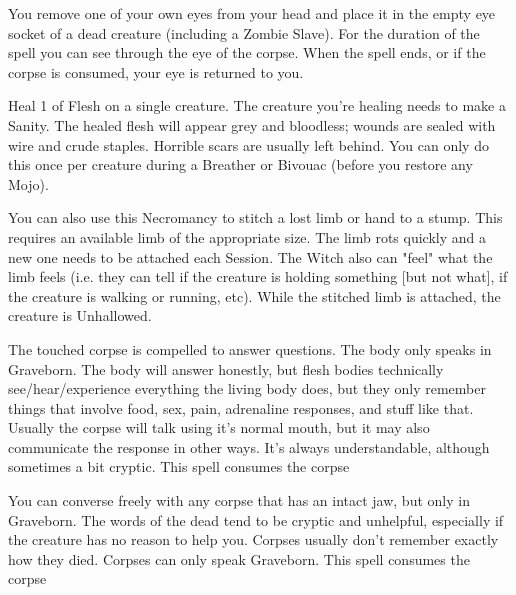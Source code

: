 {You remove one of your own eyes from your head and place it in the empty eye socket of a dead creature (including a Zombie Slave). For the duration of the spell you can see through the eye of the corpse.  When the spell ends, or if the corpse is consumed, your eye is returned to you.

\NECRO[
  Name=Knit Flesh,
  Link=necromancy-knit-flesh,
  Paradigm=Death,
  Save=N,
  Duration=0/Session,
  Mod=+9,
  Keywords=None,
  Target=Close (touch) creature
]


Heal 1 \HD of Flesh on a single creature. The creature you're healing needs to make a \RS Sanity.  The healed flesh will appear grey and bloodless; wounds are sealed with wire and crude staples.  Horrible scars are usually left behind. You can only do this once per creature during a Breather or Bivouac (before you restore any Mojo).

You can also use this Necromancy to stitch a lost limb or hand to a stump.  This requires an available limb of the appropriate size.  The limb rots quickly and a new one needs to be attached each Session.  The Witch also can "feel" what the limb feels (i.e. they can tell if the creature is holding something [but not what], if the creature is walking or running, etc).  While the stitched limb is attached, the creature is Unhallowed.


\NECRO[
  Name=Necrography,
  Link=necromancy-necrography,
  Paradigm=Death,
  Save=N,
  Duration=\LVL Minutes,
  Mod=+6,
  Keywords=None,
  Target=Close (touch) Mortal corpse
]

The touched corpse is compelled to answer \LVL questions.  The body only speaks in Graveborn. The body will answer honestly, but flesh bodies technically see/hear/experience everything the living body does, but they only remember things that involve food, sex, pain, adrenaline responses, and stuff like that. Usually the corpse will talk using it's normal mouth, but it may also communicate the response in other ways. It's always understandable, although sometimes a bit cryptic.  This spell consumes the corpse

\NECRO[
  Name=Speak with Dead,
  Link=necromancy-speak-with-dead,
  Paradigm=Death,
  Save=N,
  Duration=\LVL x2 Minutes,
  Mod=+3,
  Keywords=None,
  Target=Close (touch) Mortal corpse
]


You can converse freely with any corpse that has an intact jaw, but only in Graveborn. The words of the dead tend to be cryptic and unhelpful, especially if the creature has no reason to help you. Corpses usually don't remember exactly how they died. Corpses can only speak Graveborn.  This spell consumes the corpse

}
